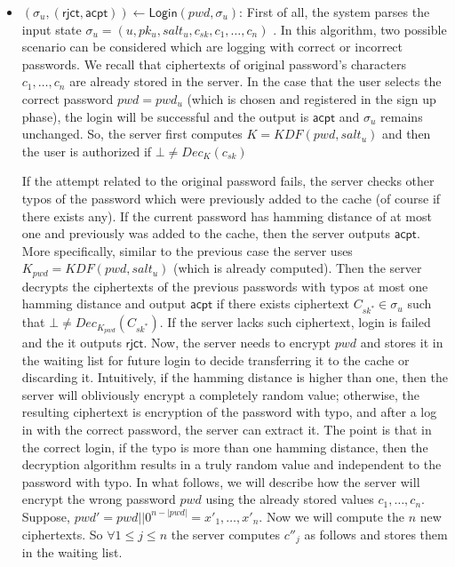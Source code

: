 \begin{itemize}
	\item $ (\sigma_u, (\mathsf{rjct, acpt}))\gets\mathsf{Login}(pwd, \sigma_u) $: First of all, the system parses the input state $ \sigma_u = (u, pk_u, salt_u, c_{sk}, c_1, \dots, c_n)  $ .  In this algorithm, two possible scenario can be considered which are logging with correct or incorrect passwords. We recall that ciphertexts of original password's characters $ c_1, \dots, c_n $ are already stored in the server. In the case that the user selects the correct password $pwd = pwd_u $ (which is chosen and registered in the sign up phase), the login will be successful and the output is $ \mathsf{acpt} $ and $ \sigma_u $ remains unchanged. So, the server first computes $ K = KDF(pwd, salt_u) $ and then the user is authorized if $ \bot \neq  Dec_{K} (c_{sk})$  

	
	If the attempt related to the original password fails, the server checks other typos of the password which were previously added to the cache (of course if there exists any).  If the current password has hamming distance of at most one and previously was added to the cache, then the server outputs $\mathsf{acpt} $. More specifically, similar to the previous case the server uses $ K_{pwd} = KDF(pwd, salt_u)$ (which is already computed). Then the server decrypts the ciphertexts of the previous passwords with typos at most one hamming distance and output $ \mathsf{acpt} $ if there exists ciphertext $ C_{sk^*} \in \sigma_u$ such that $ \bot \neq  Dec_{K_{pwd}} (C_{sk^*}) $. If the server lacks such ciphertext, login is failed and the it outputs $ \mathsf{rjct} $. Now, the server needs to encrypt $ pwd $ and stores it in the waiting list for future login to decide transferring it to the cache or discarding it. Intuitively, if the hamming distance is higher than one, then the server will obliviously encrypt a completely random value; otherwise, the resulting ciphertext is encryption of the password with typo, and after a log in with the correct password, the server can extract it.  The point is that in the correct login, if the typo is more than one hamming distance, then the decryption algorithm results in a truly random value and independent to the password with typo. In what follows, we will describe how the server will encrypt the wrong password $ pwd $ using the already stored values $ c_1, \dots, c_n $. Suppose, $ pwd' = pwd|| 0^{n-|pwd|} = x'_1, \dots, x'_n $. Now we will compute the $ n $ new ciphertexts. So $ \forall 1\leq j \leq n $ the server computes $ c''_j $ as follows and stores them in the waiting list. 
	 

\end{itemize}

